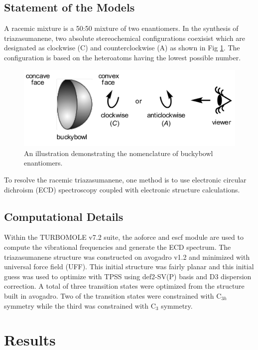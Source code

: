 \documentclass[11pt]{article}
\begin{document}
\subsection{Statement of the Models}

A racemic mixture is a 50:50 mixture of two enantiomers. In the synthesis
of triazasumanene, two absolute stereochemical configurations coexisist
which are designated as clockwise (C) and counterclockwise (A) as shown
in Fig \ref{fig:stereo}. The configuration is based on the heteroatoms
having the lowest possible number.

\begin{figure}[htbp]
  \center
  \includegraphics[scale=0.25]{buck.png}
  \caption{An illustration demonstrating the nomenclature of buckybowl
    enantiomers.}
  \label{fig:stereo}
\end{figure}

To resolve the racemic triazasumanene, one method is to use electronic
circular dichroism (ECD) spectroscopy coupled with electronic structure
calculations.

\subsection{Computational Details}

Within the TURBOMOLE v7.2 suite\cite{TURBOMOLE}, the aoforce and escf module are
used to compute the vibrational frequencies and generate the ECD spectrum. The
triazasumanene structure was constructed on avogadro v1.2\cite{Hanwell2012}
and minimized with universal force field (UFF). This initial structure was fairly
planar and this initial guess was used to optimize with TPSS\cite{PhysRevLett.91.146401}
using def2-SV(P) basis and D3 dispersion correction\cite{doi:10.1002/jcc.21759}.
A total of three transition states were optimized from the structure built in avogadro.
Two of the transition states were constrained with C$_{3h}$ symmetry while the third
was constrained with C$_3$ symmetry.

\section{Results}
\end{document}
